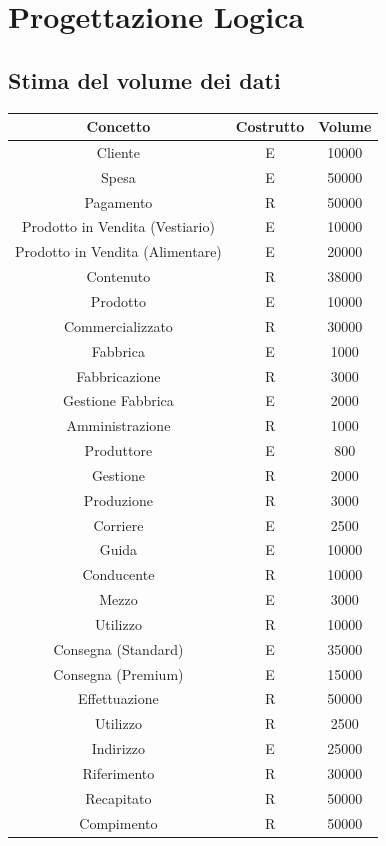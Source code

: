 \documentclass[a4paper,12pt]{report}
\begin{document}
\chapter{Progettazione Logica}
\section{Stima del volume dei dati}
\begin{center}
    \begin{tabular}{ | c  c  c|} 
    \hline
    Concetto&Costrutto&Volume \\
    \hline
	\hline
    Cliente&E&10000 \\
	Spesa&E&50000 \\
	Pagamento&R&50000 \\
	\hline
	Prodotto in Vendita (Vestiario) &E&10000 \\
	Prodotto in Vendita (Alimentare) &E&20000 \\
	Contenuto&R&38000 \\
	Prodotto&E&10000 \\
	Commercializzato&R&30000 \\
	\hline
	Fabbrica&E&1000 \\
	Fabbricazione&R&3000 \\
	Gestione Fabbrica&E&2000 \\
	Amministrazione&R&1000 \\
	Produttore&E&800\\
	Gestione&R&2000 \\
	Produzione&R&3000\\
	\hline
	Corriere&E&2500\\
	Guida&E&10000\\
	Conducente&R&10000\\
	Mezzo&E&3000\\
	Utilizzo&R&10000\\
	Consegna (Standard) &E&35000\\
	Consegna (Premium) &E&15000\\
	Effettuazione&R&50000\\
	Utilizzo&R&2500\\
	Indirizzo&E&25000\\
	Riferimento&R&30000\\
	Recapitato&R&50000\\
	Compimento&R&50000\\
    \hline
    \end{tabular}
\end{center}
\end{document}
